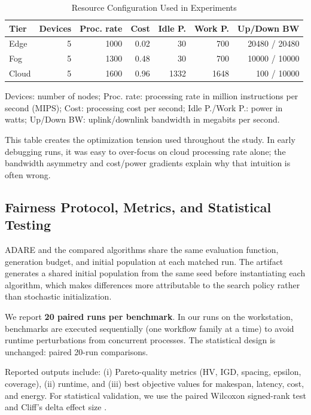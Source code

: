 \documentclass[runningheads]{llncs}
\begin{document}
\begin{table}[H]
\caption{Resource Configuration Used in Experiments}
\label{tab:envjson}
\centering
\small
\begin{tabular*}{\textwidth}{@{\extracolsep{\fill}}lrrrrrr@{}}
\toprule
Tier & Devices & Proc. rate & Cost & Idle P. & Work P. & Up/Down BW \\
\midrule
Edge & 5 & 1000 & 0.02 & 30 & 700 & 20480 / 20480 \\
Fog & 5 & 1300 & 0.48 & 30 & 700 & 10000 / 10000 \\
Cloud & 5 & 1600 & 0.96 & 1332 & 1648 & 100 / 10000 \\
\bottomrule
\end{tabular*}
\vspace{0.3ex}
\begin{minipage}{\textwidth}
\footnotesize Devices: number of nodes; Proc. rate: processing rate in million instructions per second (MIPS); Cost: processing cost per second; Idle P./Work P.: power in watts; Up/Down BW: uplink/downlink bandwidth in megabits per second.
\end{minipage}
\end{table}

This table creates the optimization tension used throughout the study. In early debugging runs, it was easy to over-focus on cloud processing rate alone; the bandwidth asymmetry and cost/power gradients explain why that intuition is often wrong.

\subsection{Fairness Protocol, Metrics, and Statistical Testing}
ADARE and the compared algorithms share the same evaluation function, generation budget, and initial population at each matched run. The artifact generates a shared initial population from the same seed before instantiating each algorithm, which makes differences more attributable to the search policy rather than stochastic initialization.

We report \textbf{20 paired runs per benchmark}. In our runs on the workstation, benchmarks are executed sequentially (one workflow family at a time) to avoid runtime perturbations from concurrent processes. The statistical design is unchanged: paired 20-run comparisons.

Reported outputs include: (i) Pareto-quality metrics (HV, IGD, spacing, epsilon, coverage), (ii) runtime, and (iii) best objective values for makespan, latency, cost, and energy. For statistical validation, we use the paired Wilcoxon signed-rank test and Cliff's delta effect size \cite{wilcoxon1945,cliff1993}.
\end{document}

